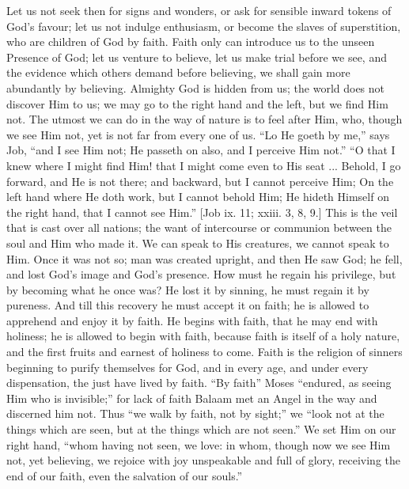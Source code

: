 Let us not seek then for signs and wonders, or ask for sensible
inward tokens of God's favour; let us not indulge enthusiasm, or become
the slaves of superstition, who are children of God by faith. Faith only
can introduce us to the unseen Presence of God; let us venture to
believe, let us make trial before we see, and the evidence which others
demand before believing, we shall gain more abundantly by believing.
Almighty God is hidden from us; the world does not discover Him to us;
we may go to the right hand and the left, but we find Him not. The
utmost we can do in the way of nature is to feel after Him, who, though
we see Him not, yet is not far from every one of us. ``Lo He goeth
by me,'' says Job, ``and I see Him not; He passeth on also, and
I perceive Him not.'' ``O that I knew where I might find Him!
that I might come even to His seat ... Behold, I go forward, and He is
not there; and backward, but I cannot perceive Him; On the left hand
where He doth work, but I cannot behold Him; He hideth Himself on the
right hand, that I cannot see Him.'' [Job ix. 11; xxiii. 3, 8, 9.]
This is the veil that is cast over all nations; the want of intercourse
or communion between the soul and Him who made it. We can speak to His
creatures, we cannot speak to Him. Once it was not so; man was created
upright, and then He saw God; he fell, and lost God's image and God's
presence. How must he regain his privilege, but by becoming what he once
was? He lost it by sinning, he must regain it by pureness. And till this
recovery he must accept it on faith; he is allowed to apprehend and
enjoy it by faith. He begins with faith, that he may end with holiness;
he is allowed to begin with faith, because faith is itself of a holy
nature, and the first fruits and earnest of holiness to come. Faith is
the religion of sinners beginning to purify themselves for God, and in
every age, and under every dispensation, the just have lived by faith.
``By faith'' Moses ``endured, as seeing Him who is
invisible;'' for lack of faith Balaam met an Angel in the way and
discerned him not. Thus ``we walk by faith, not by sight;'' we
``look not at the things which are seen, but at the things which are
not seen.'' We set Him on our right hand, ``whom having not
seen, we love: in whom, though now we see Him not, yet believing, we
rejoice with joy unspeakable and full of glory, receiving the end of our
faith, even the salvation of our souls.''

